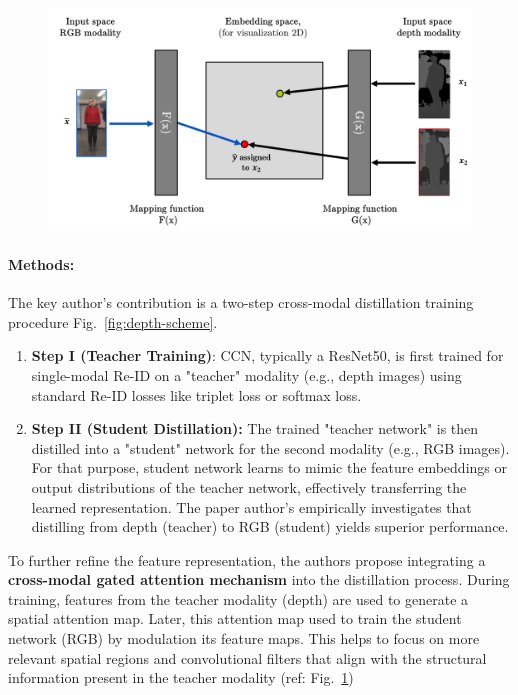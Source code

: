 \documentclass[12pt, a4paper]{article}
\begin{document}
\begin{figure}[h]
    \centering
    \includegraphics[width=0.6\linewidth]{pictures/depth-embed-match.png}
    \label{fig:depth-rgb-embed-match}
\end{figure}

\paragraph{Methods:} The key author's contribution is a two-step cross-modal distillation training procedure Fig.~\ref{fig:depth-scheme}.

\begin{enumerate}
	\item \textbf{Step I (Teacher Training)}: CCN, typically a ResNet50, is first trained for single-modal Re-ID on a "teacher" modality (e.g., depth images) using standard Re-ID losses like triplet loss or softmax loss.
	\item \textbf{Step II (Student Distillation):} The trained "teacher network" is then distilled into a "student" network for the second modality (e.g., RGB images). For that purpose, student network learns to mimic the feature embeddings or output distributions of the teacher network, effectively transferring the learned representation. The paper author's empirically investigates that distilling from depth (teacher) to RGB (student) yields superior performance.
\end{enumerate}
To further refine the feature representation, the authors propose integrating a \textbf{cross-modal gated attention mechanism} into the distillation process. During training, features from the teacher modality (depth) are used to generate a spatial attention map. Later, this attention map used to train the student network (RGB) by modulation its feature maps. This helps to focus on more relevant spatial regions and convolutional filters that align with the structural information present in the teacher modality (ref: Fig.~\ref{fig:depth-rgb-embed-match})
\end{document}
